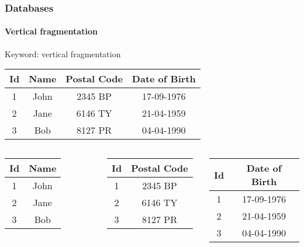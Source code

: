 \documentclass{beamer}
\begin{document}
\begin{frame}
  \frametitle{Databases}
  \framesubtitle{Vertical fragmentation}

  Keyword: \alert{vertical fragmentation}

\begin{center}
  \begin{tabular}{|c|c|c|c|}
    \hline
    Id & Name & Postal Code & Date of Birth \\
    \hline
    1 & John & 2345 BP & 17-09-1976 \\
    2 & Jane & 6146 TY & 21-04-1959 \\
    3 & Bob & 8127 PR & 04-04-1990 \\
    \hline
  \end{tabular}
\end{center}

  \begin{columns}

  \column{2cm}

  \begin{tabular}{|c|c|}
    \hline
    Id & Name \\
    \hline
    1 & John \\
    2 & Jane \\
    3 & Bob \\
    \hline
  \end{tabular}

  \column{2cm}

  \begin{tabular}{|c|c|}
    \hline
    Id & Postal Code \\
    \hline
    1 & 2345 BP \\
    2 & 6146 TY \\
    3 & 8127 PR \\
    \hline
  \end{tabular}

  \column{2cm}

  \begin{tabular}{|c|c|}
    \hline
    Id & Date of Birth \\
    \hline
    1 & 17-09-1976 \\
    2 & 21-04-1959 \\
    3 & 04-04-1990 \\
    \hline
  \end{tabular}

  \end{columns}

\end{frame}
\end{document}
